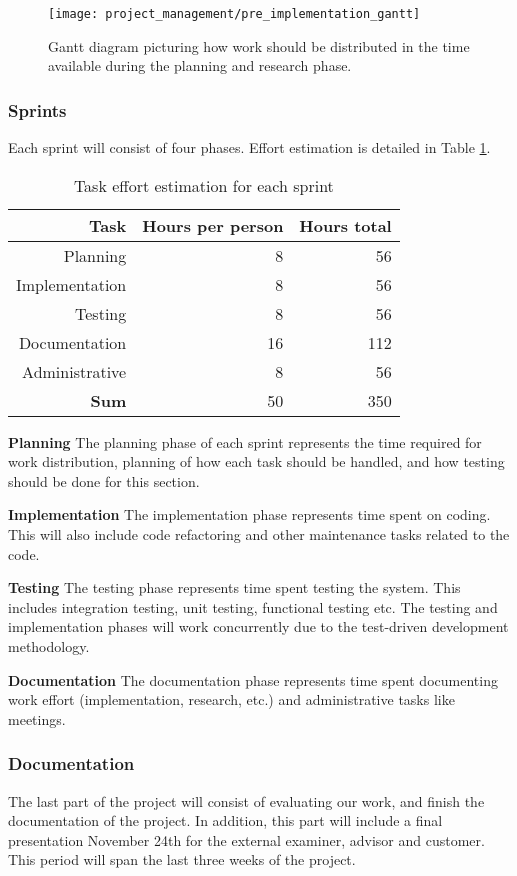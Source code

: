 \begin{figure}[h]
\centering
  \texttt{[image: project\_management/pre\_implementation\_gantt]}
  \caption[Gantt chart of planning and research phase]{Gantt diagram picturing how work should be distributed in the time available during the planning and research phase.}
  \label{gantt:pre_imp}
\end{figure}

\subsubsection{Sprints}

Each sprint will consist of four phases. Effort estimation is
detailed in Table \ref{Sprint effort estimation}.

\begin{table}[htbp]
\begin{center}
  \begin{tabular}{|r|r|r|}
    \hline
    \bf{Task} & \bf{Hours per person} & \bf{Hours total} \\
    \hline
    Planning & 8 & 56 \\
    Implementation & 8 & 56 \\
    Testing & 8 & 56 \\
    Documentation & 16 & 112 \\
    Administrative & 8 & 56 \\
    \hline \hline
    \bf{Sum} & 50 & 350 \\
    \hline
  \end{tabular}
  \caption{Task effort estimation for each sprint}
  \label{Sprint effort estimation}
\end{center}
\end{table}

\textbf{Planning} The planning phase of each sprint represents the time
required for work distribution, planning of how each task should be handled,
and how testing should be done for this section.

\textbf{Implementation} The implementation phase represents time spent on coding.
This will also include code refactoring and other maintenance tasks
related to the code.

\textbf{Testing} The testing phase represents time spent testing the system.
This includes integration testing, unit testing, functional testing etc.
The testing and implementation phases will work concurrently due to the
test-driven development methodology.

\textbf{Documentation} The documentation phase represents time spent
documenting work effort (implementation, research, etc.) and administrative
tasks like meetings.

\subsubsection{Documentation}
The last part of the project will consist of evaluating our work, and finish the documentation of the project. In addition, this part will include a final presentation November 24th for the external examiner, advisor and customer. This period will span the last three weeks of the project.  
